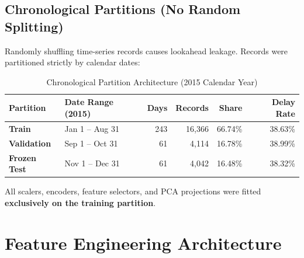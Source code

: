 \documentclass[11pt,a4paper]{article}
\begin{document}
\subsection{Chronological Partitions (No Random Splitting)}
Randomly shuffling time-series records causes lookahead leakage. Records were partitioned strictly by calendar dates:
\begin{table}[H]
\centering
\small
\caption{Chronological Partition Architecture (2015 Calendar Year)}
\label{tab:partitions}
\begin{tabular}{llrrrr}
\toprule
\textbf{Partition} & \textbf{Date Range (2015)} & \textbf{Days} & \textbf{Records} & \textbf{Share} & \textbf{Delay Rate} \\
\midrule
\textbf{Train} & Jan 1 -- Aug 31 & 243 & 16,366 & 66.74\% & 38.63\% \\
\textbf{Validation} & Sep 1 -- Oct 31 & 61 & 4,114 & 16.78\% & 38.99\% \\
\textbf{Frozen Test} & Nov 1 -- Dec 31 & 61 & 4,042 & 16.48\% & 38.32\% \\
\bottomrule
\end{tabular}
\end{table}
All scalers, encoders, feature selectors, and PCA projections were fitted \textbf{exclusively on the training partition}.

\section{Feature Engineering Architecture}
\end{document}
